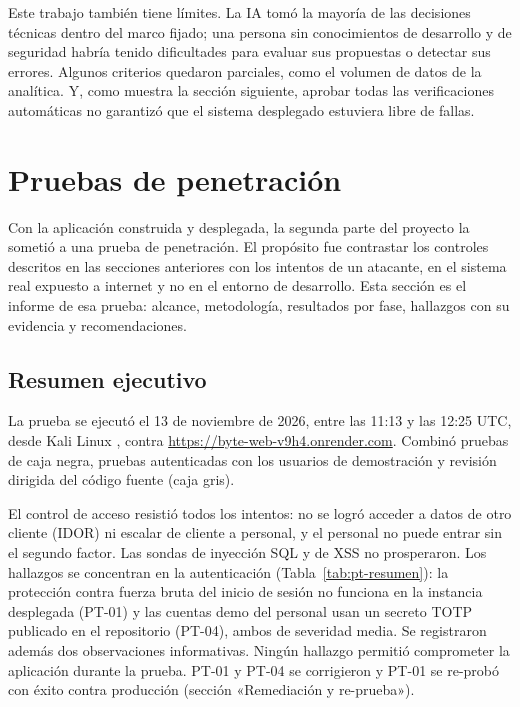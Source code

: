 \documentclass[stu,12pt,floatsintext]{apa7}
\begin{document}
Este trabajo también tiene límites. La IA tomó la mayoría de las decisiones técnicas dentro del marco
fijado; una persona sin conocimientos de desarrollo y de seguridad habría tenido dificultades para
evaluar sus propuestas o detectar sus errores. Algunos criterios quedaron parciales, como el volumen de
datos de la analítica. Y, como muestra la sección siguiente, aprobar todas las verificaciones
automáticas no garantizó que el sistema desplegado estuviera libre de fallas.

\section{Pruebas de penetración}

Con la aplicación construida y desplegada, la segunda parte del proyecto la sometió a una prueba de
penetración. El propósito fue contrastar los controles descritos en las secciones anteriores con los
intentos de un atacante, en el sistema real expuesto a internet y no en el entorno de desarrollo. Esta
sección es el informe de esa prueba: alcance, metodología, resultados por fase, hallazgos con su
evidencia y recomendaciones.

\subsection{Resumen ejecutivo}

La prueba se ejecutó el 13 de noviembre de 2026, entre las 11:13 y las 12:25 UTC, desde Kali Linux
\parencite{kali}, contra \url{https://byte-web-v9h4.onrender.com}. Combinó pruebas de caja negra, pruebas
autenticadas con los usuarios de demostración y revisión dirigida del código fuente (caja gris).

El control de acceso resistió todos los intentos: no se logró acceder a datos de otro cliente (IDOR) ni
escalar de cliente a personal, y el personal no puede entrar sin el segundo factor. Las sondas de
inyección SQL y de XSS no prosperaron. Los hallazgos se concentran en la autenticación
(Tabla~\ref{tab:pt-resumen}): la protección contra fuerza bruta del inicio de sesión no funciona en la
instancia desplegada (PT-01) y las cuentas demo del personal usan un secreto TOTP publicado en el
repositorio (PT-04), ambos de severidad media. Se registraron además dos observaciones informativas.
Ningún hallazgo permitió comprometer la aplicación durante la prueba. PT-01 y PT-04 se corrigieron y
PT-01 se re-probó con éxito contra producción (sección «Remediación y re-prueba»).
\end{document}
